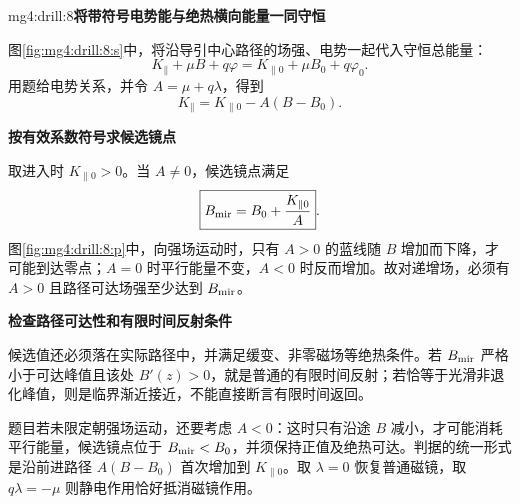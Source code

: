 \begin{drillsolution}{mg4:drill:8}\textbf{将带符号电势能与绝热横向能量一同守恒}\par\nobreak
图\ref{fig:mg4:drill:8:s}中，将沿导引中心路径的场强、电势一起代入守恒总能量：
\[
K_\parallel+\mu B+q\varphi
=K_{\parallel0}+\mu B_0+q\varphi_0.
\]
用题给电势关系，并令 $A=\mu+q\lambda$，得到
\[
\boxed{K_\parallel=K_{\parallel0}-A(B-B_0)}.
\]


\par\medskip{}\noindent\textbf{按有效系数符号求候选镜点}\par\nobreak
取进入时 $K_{\parallel0}>0$。当 $A\ne0$，候选镜点满足
\[
\boxed{B_{\rm mir}=B_0+\frac{K_{\parallel0}}{A}}.
\]
图\ref{fig:mg4:drill:8:p}中，向强场运动时，只有 $A>0$ 的蓝线随 $B$ 增加而下降，才可能到达零点；$A=0$ 时平行能量不变，$A<0$ 时反而增加。故对递增场，必须有 $A>0$ 且路径可达场强至少达到 $B_{\rm mir}$。



\par\medskip{}\noindent\textbf{检查路径可达性和有限时间反射条件}\par\nobreak
候选值还必须落在实际路径中，并满足缓变、非零磁场等绝热条件。若 $B_{\rm mir}$ 严格小于可达峰值且该处 $B'(z)>0$，就是普通的有限时间反射；若恰等于光滑非退化峰值，则是临界渐近接近，不能直接断言有限时间返回。

题目若未限定朝强场运动，还要考虑 $A<0$：这时只有沿途 $B$ 减小，才可能消耗平行能量，候选镜点位于 $B_{\rm mir}<B_0$，并须保持正值及绝热可达。判据的统一形式是沿前进路径 $A(B-B_0)$ 首次增加到 $K_{\parallel0}$。取 $\lambda=0$ 恢复普通磁镜，取 $q\lambda=-\mu$ 则静电作用恰好抵消磁镜作用。\end{drillsolution}
